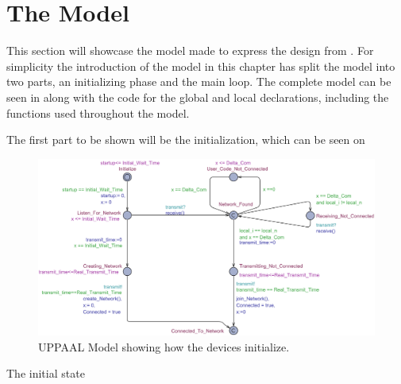 \section{The Model}
This section will showcase the model made to express the design from .
For simplicity the introduction of the model in this chapter has split the model into two parts, an initializing phase and the main loop.
The complete model can be seen in  along with the code for the global and local declarations, including the functions used throughout the model.

The first part to be shown will be the initialization, which can be seen on 

\begin{figure}
  \includegraphics[width=1\textwidth]{Figures/Model/Device_Connecting.pdf} 
\caption{UPPAAL Model showing how the devices initialize.}
\label{fig:UPPAAL_Intitialization}
\end{figure}

The initial state 